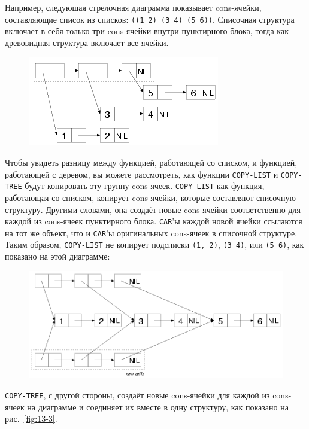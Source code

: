 Например, следующая стрелочная диаграмма показывает cons-ячейки, составляющие список из
списков: \lstinline{((1 2) (3 4) (5 6))}. Списочная структура включает в себя только три
cons-ячейки внутри пунктирного блока, тогда как древовидная структура включает все ячейки.

\begin{figure}[h]
  \centering
  \includegraphics[scale=0.6]{images/list-or-tree.png}
\end{figure}

Чтобы увидеть разницу между функцией, работающей со списком, и функцией, работающей с
деревом, вы можете рассмотреть, как функции \lstinline{COPY-LIST} и \lstinline{COPY-TREE} будут
копировать эту группу cons-ячеек. \lstinline{COPY-LIST} как функция, работающая со списком,
копирует cons-ячейки, которые составляют списочную структуру. Другими словами, она создаёт
новые cons-ячейки соответственно для каждой из cons-ячеек пунктирного блока. \lstinline{CAR}'ы
каждой новой ячейки ссылаются на тот же объект, что и \lstinline{CAR}'ы оригинальных cons-ячеек
в списочной структуре. Таким образом, \lstinline{COPY-LIST} не копирует подсписки
\lstinline{(1, 2)}, \lstinline{(3 4)}, или \lstinline{(5 6)}, как показано на этой диаграмме:

\begin{figure}[h]
  \centering
  \includegraphics[scale=0.6]{images/copy-list-list-or-tree.png}
\end{figure}

\lstinline{COPY-TREE}, с другой стороны, создаёт новые cons-ячейки для каждой из cons-ячеек на
диаграмме и соединяет их вместе в одну структуру, как показано на рис.~\ref{fig:13-3}.

